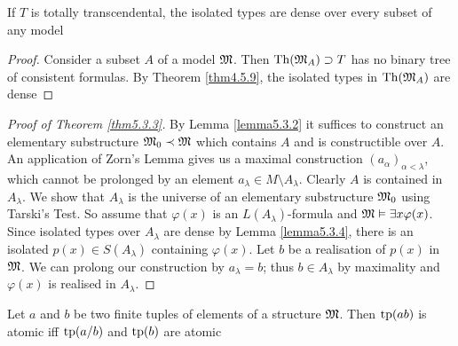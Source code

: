 \documentclass[11pt]{article}
\begin{document}

\begin{lemma}[]
\label{lemma5.3.4}
If \(T\) is totally transcendental, the isolated types are dense over every subset of any model
\end{lemma}

\begin{proof}
Consider a subset \(A\) of a model \(\mathfrak{M}\). Then \(\operatorname{Th}(\mathfrak{M}_A)\supset T\) has no binary tree of consistent
formulas. By Theorem \ref{thm4.5.9}, the isolated types in \(\operatorname{Th}(\mathfrak{M}_A)\) are dense
\end{proof}

\begin{proof}[Proof of Theorem \ref{thm5.3.3}]
By Lemma \ref{lemma5.3.2} it suffices to construct an elementary substructure \(\mathfrak{M}_0\prec\mathfrak{M}\) which
contains \(A\) and is constructible over \(A\). An application of Zorn's Lemma gives us a
maximal construction \((a_\alpha)_{\alpha<\lambda}\), which cannot be prolonged by an element \(a_\lambda\in M\setminus A_\lambda\).
Clearly \(A\) is contained in \(A_\lambda\). We show that \(A_\lambda\) is the universe of an elementary
substructure \(\mathfrak{M}_0\) using Tarski's Test. So assume that \(\varphi(x)\) is an \(L(A_\lambda)\)-formula
and \(\mathfrak{M}\vDash\exists x\varphi(x)\). Since isolated types over \(A_\lambda\) are dense by Lemma \ref{lemma5.3.4}, there is
an isolated \(p(x)\in S(A_\lambda)\) containing \(\varphi(x)\). Let \(b\) be a realisation of \(p(x)\)
in \(\mathfrak{M}\). We can prolong our construction by \(a_\lambda=b\); thus \(b\in A_\lambda\) by maximality
and \(\varphi(x)\) is realised in \(A_\lambda\).
\end{proof}

\begin{lemma}[]
\label{lemma5.3.5}
Let \(a\) and \(b\) be two finite tuples of elements of a structure \(\mathfrak{M}\). Then \(\operatorname{tp}(ab)\) is
atomic iff \(\operatorname{tp}(a/b)\) and \(\operatorname{tp}(b)\) are atomic
\end{lemma}
\end{document}
